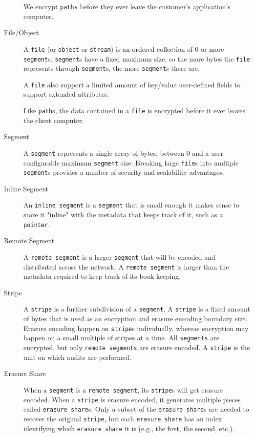 \documentclass[a4paper,10pt]{article} \usepackage[utf8]{inputenc}
\newcommand{\x}[1]{{\tt #1}} \newcommand{\code}[1]{{\tt #1}}
\begin{document}
\begin{description}
We encrypt \x{paths} before they ever leave the customer's application's
computer.

\item[File/Object] A \x{file} (or \x{object} or \x{stream}) is an ordered
collection of 0 or more \x{segment}s. \x{segment}s have a fixed maximum size,
so the more bytes the \x{file} represents through \x{segment}s, the more
\x{segment}s there are.

A \x{file} also support a limited amount of key/value user-defined fields to
support extended attributes.

Like \x{path}s, the data contained in a \x{file} is encrypted before it ever
leaves the client computer.

\item[Segment] A \x{segment} represents a single array of bytes, between 0 and a
user-configurable maximum \x{segment} size. Breaking large \x{file}s into
multiple \x{segment}s provides a number of security and scalability advantages.

\item[Inline Segment] An \x{inline segment} is a \x{segment} that is small
enough it makes sense to store it "inline" with the metadata that keeps track of
it, such as a \x{pointer}.

\item[Remote Segment] A \x{remote segment} is a larger \x{segment} that will be
encoded and distributed across the network. A \x{remote segment} is larger than
the metadata required to keep track of its book keeping.

\item[Stripe] A \x{stripe} is a further subdivision of a \x{segment}. A
\x{stripe} is a fixed amount of bytes that is used as an encryption and erasure
encoding boundary size. Erasure encoding happen on \x{stripe}s individually,
whereas encryption may happen on a small multiple of stripes at a time. All
\x{segments} are encrypted, but only \x{remote segments} are erasure encoded.
A \x{stripe} is the unit on which audits are performed.

\item[Erasure Share] When a \x{segment} is a \x{remote segment}, its \x{stripe}s
will get erasure encoded. When a \x{stripe} is erasure encoded, it generates
multiple pieces called \x{erasure share}s. Only a subset of the \x{erasure
share}s are needed to recover the original \x{stripe}, but each \x{erasure
share} has an index identifying which \x{erasure share} it is (e.g., the first,
the second, etc.).


\end{description}
\end{document}
